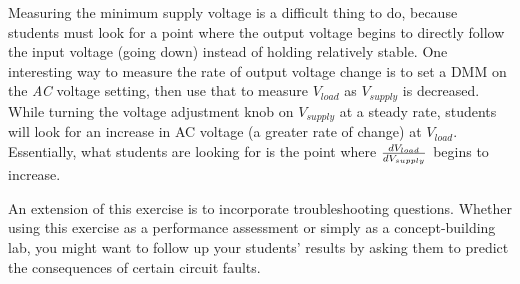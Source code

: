 Measuring the minimum supply voltage is a difficult thing to do, because students must look for a point where the output voltage begins to directly follow the input voltage (going down) instead of holding relatively stable.  One interesting way to measure the rate of output voltage change is to set a DMM on the {\it AC} voltage setting, then use that to measure $V_{load}$ as $V_{supply}$ is decreased.  While turning the voltage adjustment knob on $V_{supply}$ at a steady rate, students will look for an increase in AC voltage (a greater rate of change) at $V_{load}$.  Essentially, what students are looking for is the point where ${dV_{load} \over dV_{supply}}$ begins to increase.

An extension of this exercise is to incorporate troubleshooting questions.  Whether using this exercise as a performance assessment or simply as a concept-building lab, you might want to follow up your students' results by asking them to predict the consequences of certain circuit faults.




